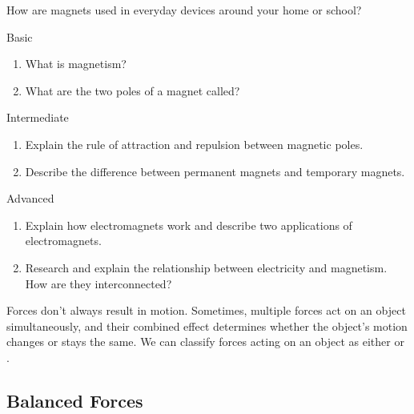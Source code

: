 \begin{stopandthink}
How are magnets used in everyday devices around your home or school?
\end{stopandthink}

\begin{tieredquestions}{Basic}
\begin{enumerate}
    \item What is magnetism?
    \item What are the two poles of a magnet called?
\end{enumerate}
\end{tieredquestions}

\begin{tieredquestions}{Intermediate}
\begin{enumerate}
    \item Explain the rule of attraction and repulsion between magnetic poles.
    \item Describe the difference between permanent magnets and temporary magnets.
\end{enumerate}
\end{tieredquestions}

\begin{tieredquestions}{Advanced}
\begin{enumerate}
    \item  Explain how electromagnets work and describe two applications of electromagnets.
    \item  Research and explain the relationship between electricity and magnetism. How are they interconnected?
\end{enumerate}
\end{tieredquestions}


\FloatBarrier
\1

\begin{marginnote}
\end{marginnote}
Forces don't always result in motion. Sometimes, multiple forces act on an object simultaneously, and their combined effect determines whether the object's motion changes or stays the same.  We can classify forces acting on an object as either  or .

\subsection{Balanced Forces}


